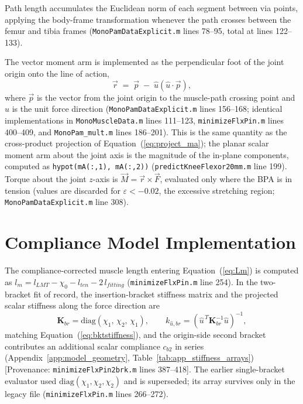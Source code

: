 Path length accumulates the Euclidean norm of each segment between via points, applying the body-frame transformation whenever the path crosses between the femur and tibia frames (\texttt{MonoPamDataExplicit.m} lines 78--95, total at lines 122--133).

The vector moment arm is implemented as the perpendicular foot of the joint origin onto the line of action,
\begin{equation}
    \vec{r} \;=\; \vec{p} \;-\; \hat{u}\left(\hat{u}\cdot\vec{p}\right),
    \label{eq:app_perpfoot}
\end{equation}
where $\vec{p}$ is the vector from the joint origin to the muscle-path crossing point and $\hat{u}$ is the unit force direction (\texttt{MonoPamDataExplicit.m} lines 156--168; identical implementations in \texttt{MonoMuscleData.m} lines 111--123, \texttt{minimizeFlxPin.m} lines 400--409, and \texttt{MonoPam\_mult.m} lines 186--201). This is the same quantity as the cross-product projection of Equation~(\ref{eq:project_ma}); the planar scalar moment arm about the joint axis is the magnitude of the in-plane components, computed as \texttt{hypot(mA(:,1), mA(:,2))} (\texttt{predictKneeFlexor20mm.m} line 199). Torque about the joint $z$-axis is $\vec{M} = \vec{r}\times\vec{F}$, evaluated only where the BPA is in tension (values are discarded for $\varepsilon < -0.02$, the excessive stretching region; \texttt{MonoPamDataExplicit.m} line 308).

\section{Compliance Model Implementation}

The compliance-corrected muscle length entering Equation~(\ref{eq:Lm}) is computed as $l_{m} = l_{LMT} - \chi_{0} - l_{ten} - 2\,l_{fitting}$ (\texttt{minimizeFlxPin.m} line 254). In the two-bracket fit of record, the insertion-bracket stiffness matrix and the projected scalar stiffness along the force direction are
\begin{equation}
    \mathbf{K}_{br} = \mathrm{diag}(\chi_{1},\,\chi_{2},\,\chi_{1}),
    \qquad
    k_{\hat{u},br} = \left(\hat{u}^{\,T}\mathbf{K}_{br}^{-1}\hat{u}\right)^{-1},
    \label{eq:app_kbr}
\end{equation}
matching Equation~(\ref{eq:bktstiffness}), and the origin-side second bracket contributes an additional scalar compliance $c_{b2}$ in series (Appendix~\ref{app:model_geometry}, Table~\ref{tab:app_stiffness_arrays}) [Provenance: \texttt{minimizeFlxPin2brk.m} lines 387--418]. The earlier single-bracket evaluator used $\mathrm{diag}(\chi_{1},\chi_{2},\chi_{2})$ and is superseded; its array survives only in the legacy file (\texttt{minimizeFlxPin.m} lines 266--272).

